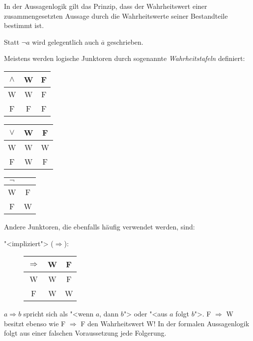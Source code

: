In der Aussagenlogik gilt %
das Prinzip, dass der Wahr\-heits\-wert 
einer
zusammengesetzten Aussage durch die Wahrheitswerte seiner Bestandteile
bestimmt ist.

Statt $\neg a$ wird gelegentlich auch $\overline{a}$ geschrieben.

Meistens werden logische Junktoren durch sogenannte \emph{Wahrheitstafeln}
 definiert:
%
\begin{center}
\begin{tabular}{c||c|c}
$\wedge$   &  W   &  F \\ \hline \hline
    W      &  W   &  F \\ \hline
    F      &  F   &  F
\end{tabular}
\hspace{3em}
\begin{tabular}{c||c|c}
$\vee$     &  W   &  F \\ \hline \hline
    W      &  W   &  W \\ \hline
    F      &  W   &  F 
\end{tabular}
\hspace{3em}
\begin{tabular}{c||c}
$\neg$     \\ \hline \hline
    W      &  F \\ \hline
    F      &  W
\end{tabular}
\end{center}
%
Andere Junktoren, die ebenfalls häufig verwendet werden, sind:
\begin{description}
\item["<impliziert"> ($ \Rightarrow $):]
%
\hspace{2em}\begin{tabular}{c||c|c}
$ \Rightarrow $     &  W   &  F \\ \hline \hline
    W      &  W   &  F \\ \hline
    F      &  W   &  W 
\end{tabular}
\end{description}

$a \Rightarrow b$ spricht sich als "<wenn $a$, dann $b$"> oder "<aus $a$
folgt $b$">.  F $\Rightarrow$ W besitzt ebenso wie F $\Rightarrow$ F
den Wahrheitswert W! In der formalen Aussagenlogik folgt
aus einer falschen Voraussetzung jede Folgerung.  %

